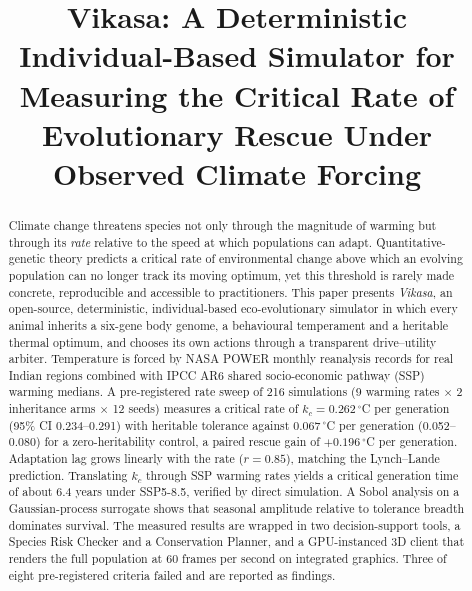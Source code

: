 \documentclass[conference]{IEEEtran}
\begin{document}
\title{Vikasa: A Deterministic Individual-Based Simulator for Measuring the Critical Rate of Evolutionary Rescue Under Observed Climate Forcing}

\author{
}

\maketitle

\begin{abstract}
Climate change threatens species not only through the magnitude of warming but
through its \emph{rate} relative to the speed at which populations can adapt.
Quantitative-genetic theory predicts a critical rate of environmental change above
which an evolving population can no longer track its moving optimum, yet this
threshold is rarely made concrete, reproducible and accessible to practitioners.
This paper presents \emph{Vikasa}, an open-source, deterministic, individual-based
eco-evolutionary simulator in which every animal inherits a six-gene body genome,
a behavioural temperament and a heritable thermal optimum, and chooses its own
actions through a transparent drive--utility arbiter. Temperature is forced by
NASA POWER monthly reanalysis records for real Indian regions combined with IPCC
AR6 shared socio-economic pathway (SSP) warming medians. A pre-registered rate
sweep of 216 simulations (9 warming rates $\times$ 2 inheritance arms $\times$ 12
seeds) measures a critical rate of $k_c=0.262\,^{\circ}$C per generation (95\%
CI 0.234--0.291) with heritable tolerance against $0.067\,^{\circ}$C per
generation (0.052--0.080) for a zero-heritability control, a paired rescue gain of
$+0.196\,^{\circ}$C per generation. Adaptation lag grows linearly with the rate
($r=0.85$), matching the Lynch--Lande prediction. Translating $k_c$ through SSP
warming rates yields a critical generation time of about 6.4 years under SSP5-8.5,
verified by direct simulation. A Sobol analysis on a Gaussian-process surrogate
shows that seasonal amplitude relative to tolerance breadth dominates survival.
The measured results are wrapped in two decision-support tools, a Species Risk
Checker and a Conservation Planner, and a GPU-instanced 3D client that renders the
full population at 60 frames per second on integrated graphics. Three of eight
pre-registered criteria failed and are reported as findings.
\end{abstract}
\end{document}
